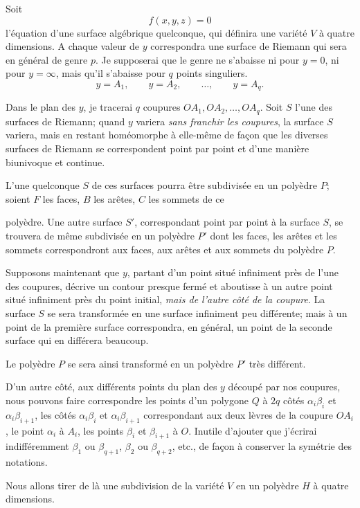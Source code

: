 \documentclass{article}
\begin{document}
Soit
\[ f(x, y, z) = 0 \tag{1} \]
l'équation d'une surface algébrique quelconque, qui définira une variété $V$ à quatre dimensions. A chaque valeur de $y$ correspondra une surface de Riemann qui sera en général de genre $p$. Je supposerai que le genre ne s'abaisse ni pour $y = 0$, ni pour $y = \infty$, mais qu'il s'abaisse pour $q$ points singuliers.
\[ y = A_{1}, \qquad y = A_{2}, \qquad \ldots, \qquad y = A_{q}. \]

Dans le plan des $y$, je tracerai $q$ coupures $OA_{1}, OA_{2}, \ldots, OA_{q}$. Soit $S$ l'une des surfaces de Riemann; quand $y$ variera \emph{sans franchir les coupures}, la surface $S$ variera, mais en restant homéomorphe à elle-même de façon que les diverses surfaces de Riemann se correspondent point par point et d'une manière biunivoque et continue.

L'une quelconque $S$ de ces surfaces pourra être subdivisée en un polyèdre $P$; soient $F$ les faces, $B$ les arêtes, $C$ les sommets de ce

polyèdre. Une autre surface $S'$, correspondant point par point à la surface $S$, se trouvera de même subdivisée en un polyèdre $P'$ dont les faces, les arêtes et les sommets correspondront aux faces, aux arêtes et aux sommets du polyèdre $P$.

Supposons maintenant que $y$, partant d'un point situé infiniment près de l'une des coupures, décrive un contour presque fermé et aboutisse à un autre point situé infiniment près du point initial, \emph{mais de l'autre côté de la coupure}. La surface $S$ se sera transformée en une surface infiniment peu différente; mais à un point de la première surface correspondra, en général, un point de la seconde surface qui en différera beaucoup.

Le polyèdre $P$ se sera ainsi transformé en un polyèdre $P'$ très différent.

D'un autre côté, aux différents points du plan des $y$ découpé par nos coupures, nous pouvons faire correspondre les points d'un polygone $Q$ à $2q$ côtés $\alpha_{i}\beta_{i}$ et $\alpha_{i}\beta_{i+1}$, les côtés $\alpha_{i}\beta_{i}$ et $\alpha_{i}\beta_{i+1}$ correspondant aux deux lèvres de la coupure $OA_{i}$, le point $\alpha_{i}$ à $A_{i}$, les points $\beta_{i}$ et $\beta_{i+1}$ à $O$. Inutile d'ajouter que j'écrirai indifféremment $\beta_{1}$ ou $\beta_{q+1}$, $\beta_{2}$ ou $\beta_{q+2}$, etc., de façon à conserver la symétrie des notations.

Nous allons tirer de là une subdivision de la variété $V$ en un polyèdre $H$ à quatre dimensions.
\end{document}
